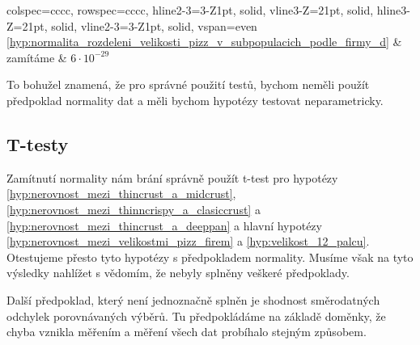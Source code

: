 \begin{table}[H]
\begin{tblr}{
			colspec={cccc},
			rowspec={cccc},
			hline{2-3}={3-Z}{1pt, solid},
			vline{3-Z}={2}{1pt, solid},
			hline{3-Z}={2}{1pt, solid},
			vline{2-3}={3-Z}{1pt, solid},
			vspan=even
		}
{{				\ref{hyp:normalita_rozdeleni_velikosti_pizz_v_subpopulacich_podle_firmy_d}}}
		                                                      &  zamítáme
		                                                      &  $6\cdot10^{-29}$                                                                                                                                                     \\
	\end{tblr}
	\caption{\emph{Pearsonův chí-kvadrát test} pro hypotézy normality
		\ref{hyp:normalita_rozdeleni_velikosti_pizz_pro_firmu_eagle_boys_v_subpopulacich_podle_typu_kurky},
		\ref{hyp:normalita_rozdeleni_velikosti_pizz_pro_firmu_dominos_v_subpopulacich_podle_typu_kurky} a
		\ref{hyp:normalita_rozdeleni_velikosti_pizz_v_subpopulacich_podle_firmy}}
\end{table}

To bohužel znamená, že pro správné použití testů, bychom neměli použít předpoklad normality dat a měli bychom hypotézy testovat neparametricky.

\subsection{T-testy}%
\label{sub:t-testy}
Zamítnutí normality nám brání správně použít t-test pro hypotézy
\ref{hyp:nerovnost_mezi_thincrust_a_midcrust}, \ref{hyp:nerovnost_mezi_thinncrispy_a_clasiccrust} a
\ref{hyp:nerovnost_mezi_thincrust_a_deeppan} a hlavní hypotézy
\ref{hyp:nerovnost_mezi_velikostmi_pizz_firem} a \ref{hyp:velikost_12_palcu}. Otestujeme přesto tyto
hypotézy s předpokladem normality. Musíme však na tyto výsledky nahlížet s vědomím, že nebyly splněny
veškeré předpoklady.

\begin{note}
	Další předpoklad, který není jednoznačně splněn je shodnost směrodatných odchylek porovnávaných
	výběrů. Tu předpokládáme na základě doměnky, že chyba vznikla měřením a měření všech dat
	probíhalo stejným způsobem.
\end{note}



